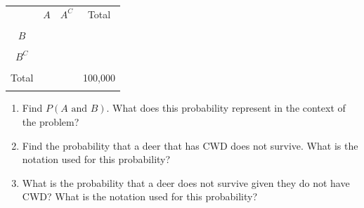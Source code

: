 \documentclass[
]{report}
\begin{document}
\begin{center}
\begin{tabular}{|c|c|c|c|} \hline
\hspace{0.8in} & \hspace{0.35in} $A$ \hspace{.35in} & \hspace{0.35in} $A^C$  \hspace{0.35in} & \hspace{0.3in} Total \hspace{0.3in} \\ 
& & & \\ \hline
$B$& & & \\ 
& & & \\ \hline
$B^C$& & & \\ 
& & & \\ \hline
Total & & & 100,000 \\ 
& & & \\ \hline
\end{tabular}
\end{center}
\vspace{.1in}

\begin{enumerate}
\def\labelenumi{\alph{enumi}.}
\setcounter{enumi}{2}
\item
  Find \(P(A \mbox{ and } B)\). What does this probability represent in the context of the problem?
  \vspace{.8in}
\item
  Find the probability that a deer that has CWD does not survive. What is the notation used for this probability?
  \vspace{.8in}
\item
  What is the probability that a deer does not survive given they do not have CWD? What is the notation used for this probability?
\end{enumerate}

\newpage
\end{document}
